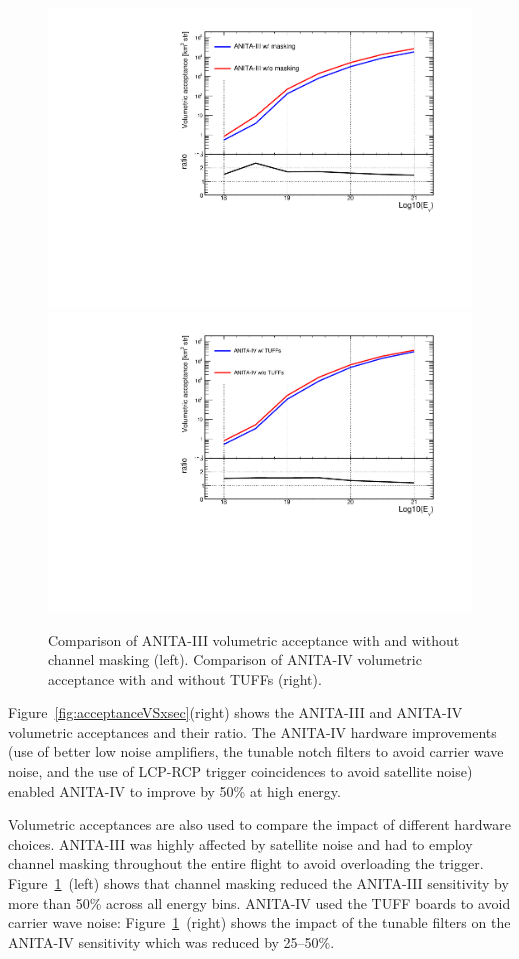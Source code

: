 \begin{figure}[!h]\centering
  \includegraphics[width=.45\linewidth]{./Figs/CompareEffVol_A3masking.pdf}
  \includegraphics[width=.45\linewidth]{./Figs/CompareEffVol_A4tuff.pdf}
  \caption{Comparison of ANITA-III volumetric acceptance with and without channel masking (left).
  Comparison of ANITA-IV volumetric acceptance with and without TUFFs (right).}
  \label{fig:acceptanceVariations}
\end{figure}

Figure~\ref{fig:acceptanceVSxsec}(right) shows the ANITA-III and ANITA-IV volumetric acceptances and their ratio.
The ANITA-IV hardware improvements (use of better low noise amplifiers, the tunable notch filters to avoid carrier wave noise, and the use of LCP-RCP trigger coincidences to avoid satellite noise) enabled ANITA-IV to improve by 50\% at high energy.

Volumetric acceptances are also used to compare the impact of different hardware choices.
ANITA-III was highly affected by satellite noise and had to employ channel masking throughout the entire flight to avoid overloading the trigger. Figure~\ref{fig:acceptanceVariations}~(left) shows that channel masking reduced the ANITA-III sensitivity by more than 50\% across all energy bins.
ANITA-IV used the TUFF boards to avoid carrier wave noise: Figure~\ref{fig:acceptanceVariations}~(right) shows the impact of the tunable filters on the ANITA-IV sensitivity which was reduced by 25--50\%.


